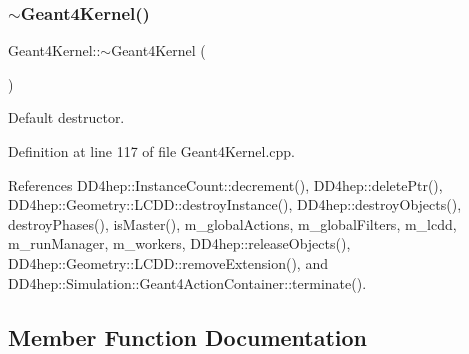 \hypertarget{class_d_d4hep_1_1_simulation_1_1_geant4_kernel_a57dadf34909a60f7771fa15d4b7501d4}{}\label{class_d_d4hep_1_1_simulation_1_1_geant4_kernel_a57dadf34909a60f7771fa15d4b7501d4} 
\subsubsection{\texorpdfstring{$\sim$\+Geant4\+Kernel()}{~Geant4Kernel()}}
{\footnotesize\ttfamily Geant4\+Kernel\+::$\sim$\+Geant4\+Kernel (\begin{DoxyParamCaption}{ }\end{DoxyParamCaption})\hspace{0.3cm}{\ttfamily [virtual]}}



Default destructor. 



Definition at line 117 of file Geant4\+Kernel.\+cpp.



References D\+D4hep\+::\+Instance\+Count\+::decrement(), D\+D4hep\+::delete\+Ptr(), D\+D4hep\+::\+Geometry\+::\+L\+C\+D\+D\+::destroy\+Instance(), D\+D4hep\+::destroy\+Objects(), destroy\+Phases(), is\+Master(), m\+\_\+global\+Actions, m\+\_\+global\+Filters, m\+\_\+lcdd, m\+\_\+run\+Manager, m\+\_\+workers, D\+D4hep\+::release\+Objects(), D\+D4hep\+::\+Geometry\+::\+L\+C\+D\+D\+::remove\+Extension(), and D\+D4hep\+::\+Simulation\+::\+Geant4\+Action\+Container\+::terminate().



\subsection{Member Function Documentation}
\hypertarget{class_d_d4hep_1_1_simulation_1_1_geant4_kernel_a7b04d88f6257e121268032dfe2bdc2d4}{}\label{class_d_d4hep_1_1_simulation_1_1_geant4_kernel_a7b04d88f6257e121268032dfe2bdc2d4} 
